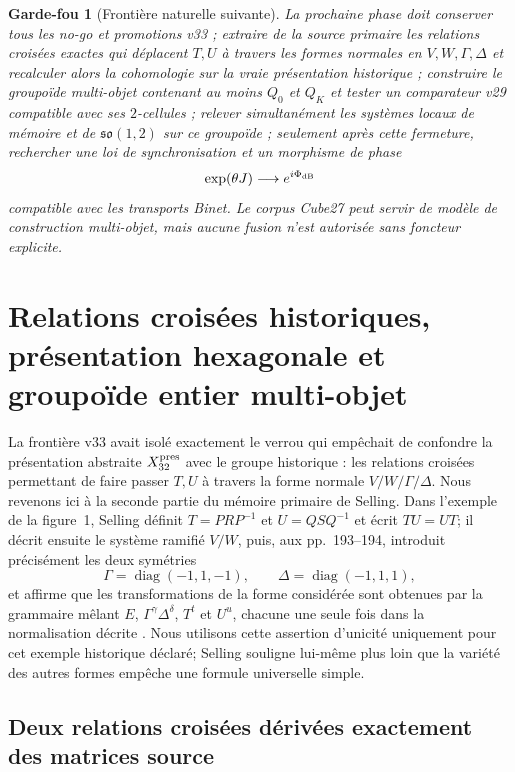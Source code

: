 \documentclass[11pt,a4paper]{article}
\newtheorem{guardrail}[theorem]{Garde-fou}
\begin{document}
\begin{guardrail}[Frontière naturelle suivante]
La prochaine phase doit conserver tous les no-go et promotions v33 ; extraire de la source primaire
les relations croisées exactes qui déplacent $T,U$ à travers les formes normales en
$V,W,\Gamma,\Delta$ et recalculer alors la cohomologie sur la vraie présentation historique ;
construire le groupoïde multi-objet contenant au moins $Q_0$ et $Q_K$ et tester un comparateur
v29 compatible avec ses $2$-cellules ; relever simultanément les systèmes locaux de mémoire et de
$\mathfrak{so}(1,2)$ sur ce groupoïde ; seulement après cette fermeture, rechercher une loi de
synchronisation et un morphisme de phase
\[
 \exp(\theta J)\longrightarrow e^{i\Phi_{\rm dB}}
\]
compatible avec les transports Binet. Le corpus Cube27 peut servir de modèle de construction
multi-objet, mais aucune fusion n'est autorisée sans foncteur explicite.
\end{guardrail}


\section{Relations croisées historiques, présentation hexagonale et groupoïde entier multi-objet}\label{sec:v34-mixed-racg-groupoid}

La frontière v33 avait isolé exactement le verrou qui empêchait de confondre la présentation
abstraite $X_{32}^{\rm pres}$ avec le groupe historique : les relations croisées permettant de
faire passer $T,U$ à travers la forme normale $V/W/\Gamma/\Delta$. Nous revenons ici à la
seconde partie du mémoire primaire de Selling. Dans l'exemple de la figure~1, Selling définit
$T=PRP^{-1}$ et $U=QSQ^{-1}$ et écrit $TU=UT$; il décrit ensuite le système ramifié $V/W$, puis,
aux pp.~193--194, introduit précisément les deux symétries
\[
 \Gamma=\operatorname{diag}(-1,1,-1),\qquad
 \Delta=\operatorname{diag}(-1,1,1),
\]
et affirme que les transformations de la forme considérée sont obtenues par la grammaire mêlant
$E$, $\Gamma^\gamma\Delta^\delta$, $T^t$ et $U^u$, chacune une seule fois dans la normalisation
décrite \cite{Selling1877}. Nous utilisons cette assertion d'unicité uniquement pour cet exemple
historique déclaré; Selling souligne lui-même plus loin que la variété des autres formes empêche
une formule universelle simple.

\subsection{Deux relations croisées dérivées exactement des matrices source}
\end{document}
